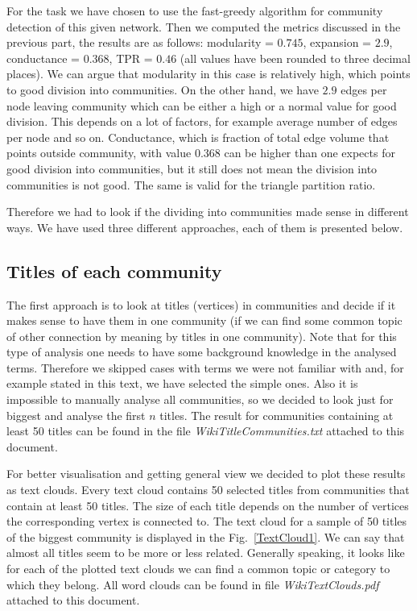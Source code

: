 \documentclass[paper=a4, fontsize=11pt]{scrartcl} %
\begin{document}
For the task we have chosen to use the fast-greedy algorithm for community detection of this given network. Then we computed the metrics discussed in the previous part, the results are as follows: modularity = $0.745$, expansion = $2.9$, conductance = $0.368$, TPR = $0.46$ (all values have been rounded to three decimal places). We can argue that modularity in this case is relatively high, which points to good division into communities. On the other hand, we have $2.9$ edges per node leaving community which can be either a high or a normal value for good division. This depends on a lot of factors, for example average number of edges per node and so on. Conductance, which is fraction of total edge volume that points outside community, with value $0.368$ can be higher than one expects for good division into communities, but it still does not mean the division into communities is not good. The same is valid for the triangle partition ratio.

Therefore we had to look if the dividing into communities made sense in different ways. We have used three different approaches, each of them is presented below.

\subsection{Titles of each community}
The first approach is to look at titles (vertices) in communities and decide if it makes sense to have them in one community (if we can find some common topic of other connection by meaning by titles in one community). Note that for this type of analysis one needs to have some background knowledge in the analysed terms. Therefore we skipped cases with terms we were not familiar with and, for example stated in this text, we have selected the simple ones. Also it is impossible to manually analyse all communities, so we decided to look just for biggest and analyse the first $n$ titles. The result for communities containing at least 50 titles can be found in the file \textit{WikiTitleCommunities.txt} attached to this document. 

For better visualisation and getting general view we decided to plot these results as text clouds. Every text cloud contains 50 selected titles from communities that contain at least 50 titles. The size of each title depends on the number of vertices the corresponding vertex is connected to. The text cloud for a sample of 50 titles of the biggest community is displayed in the Fig.~\ref{TextCloud1}. We can say that almost all titles seem to be more or less related. Generally speaking, it looks like for each of the plotted text clouds we can find a common topic or category to which they belong. All word clouds can be found in file \textit{WikiTextClouds.pdf} attached to this document.
\end{document}
